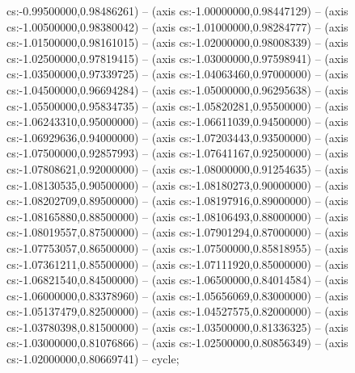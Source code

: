 cs:-0.99500000,0.98486261) -- (axis cs:-1.00000000,0.98447129) -- (axis cs:-1.00500000,0.98380042) -- (axis cs:-1.01000000,0.98284777) -- (axis cs:-1.01500000,0.98161015) -- (axis cs:-1.02000000,0.98008339) -- (axis cs:-1.02500000,0.97819415) -- (axis cs:-1.03000000,0.97598941) -- (axis cs:-1.03500000,0.97339725) -- (axis cs:-1.04063460,0.97000000) -- (axis cs:-1.04500000,0.96694284) -- (axis cs:-1.05000000,0.96295638) -- (axis cs:-1.05500000,0.95834735) -- (axis cs:-1.05820281,0.95500000) -- (axis cs:-1.06243310,0.95000000) -- (axis cs:-1.06611039,0.94500000) -- (axis cs:-1.06929636,0.94000000) -- (axis cs:-1.07203443,0.93500000) -- (axis cs:-1.07500000,0.92857993) -- (axis cs:-1.07641167,0.92500000) -- (axis cs:-1.07808621,0.92000000) -- (axis cs:-1.08000000,0.91254635) -- (axis cs:-1.08130535,0.90500000) -- (axis cs:-1.08180273,0.90000000) -- (axis cs:-1.08202709,0.89500000) -- (axis cs:-1.08197916,0.89000000) -- (axis cs:-1.08165880,0.88500000) -- (axis cs:-1.08106493,0.88000000) -- (axis cs:-1.08019557,0.87500000) -- (axis cs:-1.07901294,0.87000000) -- (axis cs:-1.07753057,0.86500000) -- (axis cs:-1.07500000,0.85818955) -- (axis cs:-1.07361211,0.85500000) -- (axis cs:-1.07111920,0.85000000) -- (axis cs:-1.06821540,0.84500000) -- (axis cs:-1.06500000,0.84014584) -- (axis cs:-1.06000000,0.83378960) -- (axis cs:-1.05656069,0.83000000) -- (axis cs:-1.05137479,0.82500000) -- (axis cs:-1.04527575,0.82000000) -- (axis cs:-1.03780398,0.81500000) -- (axis cs:-1.03500000,0.81336325) -- (axis cs:-1.03000000,0.81076866) -- (axis cs:-1.02500000,0.80856349) -- (axis cs:-1.02000000,0.80669741) -- cycle;
